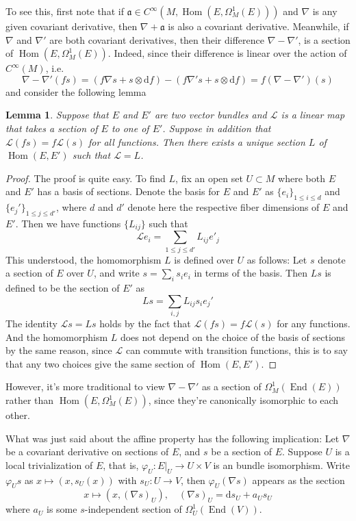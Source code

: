 \documentclass[11pt]{amsart}
\numberwithin{equation}{section}
\theoremstyle{plain}
\theoremstyle{plain}
\newtheorem{lemmasub}[thmsub]{Lemma}
\numberwithin{equation}{section}
\begin{document}
To see this, first note that if $\mathfrak{a}\in C^{\infty}(M,\operatorname{Hom}(E,\Omega_M^1(E)))$ and $\nabla$ is any given covariant derivative, then $\nabla+\mathfrak{a}$ is also a covariant derivative. Meanwhile, if $\nabla$ and $\nabla'$ are both covariant derivatives, then their difference $\nabla-\nabla'$, is a section of $\operatorname{Hom}(E,\Omega_M^1(E))$. Indeed, since their difference is linear over the action of $C^{\infty}(M)$, i.e.
$$
\nabla-\nabla'(fs)=(f\nabla s+s\otimes\mathrm{d}f)-(f\nabla' s+s\otimes\mathrm{d}f)=f(\nabla-\nabla')(s)
$$
and consider the following lemma
\begin{lemmasub}
Suppose that $E$ and $E'$ are two vector bundles and $\mathcal{L}$ is a linear map that takes a section of $E$ to one of $E'$. Suppose in addition that $\mathcal{L}(fs)=f\mathcal{L}(s)$ for all functions. Then there exists a unique section $L$ of $\operatorname{Hom}(E,E')$ such that $\mathcal{L}=L$.
\end{lemmasub}
\begin{proof}
The proof is quite easy. To find $L$, fix an open set $U\subset M$ where both $E$ and $E'$ has a basis of sections. Denote the basis for $E$ and $E'$ as $\{e_i\}_{1\leq i\leq d}$ and $\{e_j'\}_{1\leq j\leq d'}$, where $d$ and $d'$ denote here the respective fiber dimensions of $E$ and $E'$. Then we have functions $\{L_{ij}\}$ such that 
$$
\mathcal{L}e_i=\sum_{1\leq j\leq d'}L_{ij}e'_j
$$
This understood, the homomorphism $L$ is defined over $U$ as follows: Let $s$ denote a section of $E$ over $U$, and write $s=\sum_{i}s_ie_i$ in terms of the basis. Then $Ls$ is defined to be the section of $E'$ as 
$$
Ls=\sum_{i,j}L_{ij}s_ie_j'
$$
The identity $\mathcal{L}s=Ls$ holds by the fact that $\mathcal{L}(fs)=f\mathcal{L}(s)$ for any functions. And the homomorphism $L$ does not depend on the choice of the basis of sections by the same reason, since $\mathcal{L}$ can commute with transition functions, this is to say that any two choices give the same section of $\operatorname{Hom}(E,E')$.
\end{proof}

However, it's more traditional to view $\nabla-\nabla'$ as a section of $\Omega_M^1(\operatorname{End}(E))$ rather than $\operatorname{Hom}(E,\Omega_M^1(E))$, since they're canonically isomorphic to each other.

What was just said about the affine property has the following implication: Let $\nabla$ be a covariant derivative on sections of $E$, and $s$ be a section of $E$. Suppose $U$ is a local trivialization of $E$, that is, $\varphi_U:E|_U\to U\times V$ is an bundle isomorphism. Write $\varphi_Us$ as $x\mapsto(x,s_U(x))$ with $s_U:U\to V$, then $\varphi_U(\nabla s)$ appears as the section
$$
x\mapsto (x,(\nabla s)_U),\quad (\nabla s)_U=\mathrm{d}s_U+a_Us_U
$$
where $a_U$ is some $s$-independent section of $\Omega_U^1(\operatorname{End}(V))$.
\end{document}
